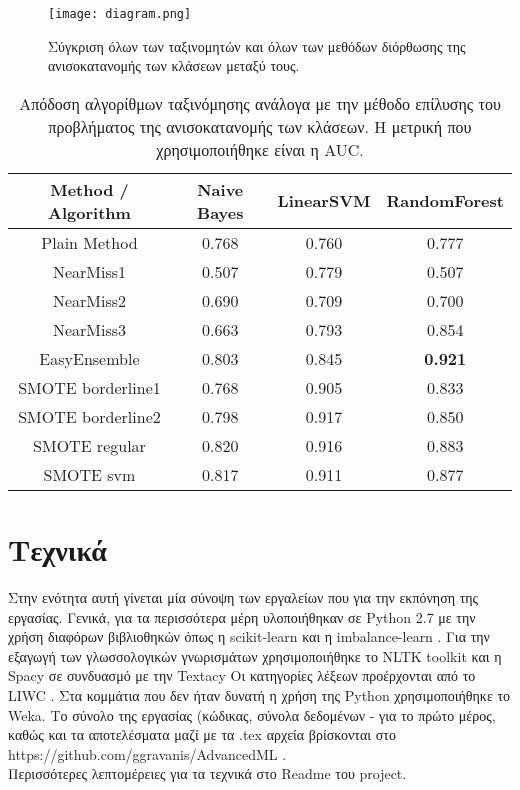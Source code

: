 \begin{figure}
	\centering
	\texttt{[image: diagram.png]} %
	\caption{Σύγκριση όλων των ταξινομητών και όλων των μεθόδων διόρθωσης της ανισοκατανομής των κλάσεων μεταξύ τους.}
	\label{fig:balance}
\end{figure}

\begin{table*}
	\centering
	\caption{Απόδοση αλγορίθμων ταξινόμησης ανάλογα με την μέθοδο επίλυσης του προβλήματος της ανισοκατανομής των κλάσεων. Η μετρική που χρησιμοποιήθηκε είναι η AUC.}
	\label{tab: imbalance}
	\begin{tabular}{cccc}
			\hline
		\ttfamily Method / Algorithm & \ttfamily Naive Bayes & \ttfamily LinearSVM & \ttfamily RandomForest 	\\	\hline
		Plain Method & 0.768       & 0.760     & 0.777         \\ \hline
		NearMiss1 & 0.507       & 0.779     & 0.507\\ \hline
		NearMiss2 & 0.690       & 0.709     & 0.700\\ \hline
		NearMiss3 & 0.663       & 0.793     & 0.854\\ \hline
		EasyEnsemble & 0.803       & 0.845     & \textbf{0.921}\\ \hline
		SMOTE borderline1 & 0.768       & 0.905     & 0.833\\ \hline
		SMOTE borderline2 & 0.798       & 0.917     & 0.850\\ \hline
		SMOTE regular & 0.820       & 0.916     & 0.883\\ \hline
		SMOTE svm & 0.817       & 0.911     & 0.877\\ \hline
		

	\end{tabular}
\end{table*}


\section{Τεχνικά}

Στην ενότητα αυτή γίνεται μία σύνοψη των εργαλείων που για την εκπόνηση της εργασίας.
Γενικά, για τα περισσότερα μέρη υλοποιήθηκαν σε Python 2.7 με την χρήση διαφόρων βιβλιοθηκών
όπως η scikit-learn \citep{scikit-learn} και η imbalance-learn \citep{JMLR:v18:16-365}. Για την εξαγωγή των 
γλωσσολογικών γνωρισμάτων χρησιμοποιήθηκε το NLTK toolkit \citep{Bird:2006} και η Spacy σε συνδυασμό με την Textacy \citep{spacy} Οι κατηγορίες λέξεων προέρχονται από το LIWC \citep{LIWC}. Στα κομμάτια που δεν ήταν δυνατή η χρήση της Python χρησιμοποιήθηκε το Weka. Το σύνολο της εργασίας (κώδικας, σύνολα δεδομένων - για το πρώτο μέρος, καθώς και τα αποτελέσματα μαζί με τα .tex αρχεία βρίσκονται στο \\ https://github.com/ggravanis/AdvancedML .\\

Περισσότερες λεπτομέρειες για τα τεχνικά στο Readme του project.

